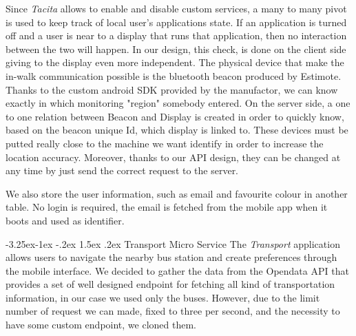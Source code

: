 \documentclass[]{usiinfbachelorproject}
\makeatletter
\newcommand\subsubsection{\@startsection{subsubsection}{3}{\z@}%
                {-3.25ex\@plus -1ex \@minus -.2ex}%
                {1.5ex \@plus .2ex}%
                {\normalfont\normalsize\bfseries}}
\makeatother
\begin{document}
Since \emph{Tacita} allows to enable and disable custom services, a many to many pivot is used to keep track of local user's applications state. If an application is turned off and a user is near to a display that runs that application, then no interaction between the two will happen. In our design, this check, is done on the client side giving to the display even more independent.
The physical device that make the in-walk communication possible is the bluetooth beacon produced by Estimote. Thanks to the custom android SDK provided by the manufactor, we can know exactly in which monitoring "region" somebody entered. On the server side, a one to one relation between Beacon and Display is created in order to quickly know, based on the beacon unique Id, which display is linked to. These devices must be putted really close to the machine we want identify in order to increase the location accuracy. Moreover, thanks to our API design, they can be changed at any time by just send the correct request to the server.

\begin{figure}[H]
  \centering
\end{figure} 




We also store the user information, such as email and favourite colour in another table. No login is required, the email is fetched from the mobile app when it boots and used as identifier. 

\subsubsection{Transport Micro Service}
The \emph{Transport} application allows users to navigate the nearby bus station and create preferences through the mobile interface. We decided to gather the data from the Opendata API that provides a set of well designed endpoint for fetching all kind of transportation information, in our case we used only the buses. However, due to the limit number of request we can made, fixed to three per second, and the necessity to have some custom endpoint, we cloned them.
\end{document}
